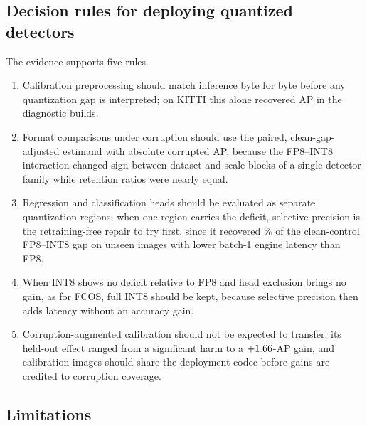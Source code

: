 \documentclass[a4paper,fleqn]{cas-dc}
\begin{document}
\subsection{Decision rules for deploying quantized detectors}
\label{sec:decision-rules}

The evidence supports five rules.
\begin{enumerate}[label=(\roman*),leftmargin=1.9em,itemsep=1pt,topsep=2pt,parsep=0pt]
\item Calibration preprocessing should match inference byte for byte before any quantization gap is interpreted; on KITTI this alone recovered \nnDiagPreprocGain{} AP in the diagnostic builds.
\item Format comparisons under corruption should use the paired, clean-gap-adjusted estimand with absolute corrupted AP, because the FP8--INT8 interaction changed sign between dataset and scale blocks of a single detector family while retention ratios were nearly equal.
\item Regression and classification heads should be evaluated as separate quantization regions; when one region carries the deficit, selective precision is the retraining-free repair to try first, since it recovered \nnHvRecovPct\% of the clean-control FP8--INT8 gap on unseen images with lower batch-1 engine latency than FP8.
\item When INT8 shows no deficit relative to FP8 and head exclusion brings no gain, as for FCOS, full INT8 should be kept, because selective precision then adds latency without an accuracy gain.
\item Corruption-augmented calibration should not be expected to transfer; its held-out effect ranged from a significant harm to a $+1.66$-AP gain, and calibration images should share the deployment codec before gains are credited to corruption coverage.
\end{enumerate}

\subsection{Limitations}
\label{sec:limitations}
\end{document}
